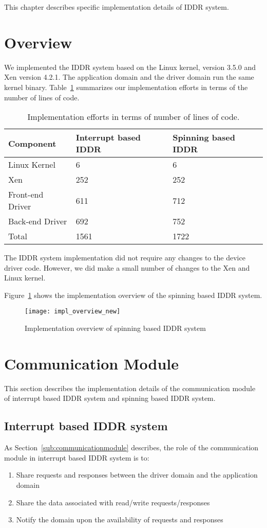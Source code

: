 This chapter describes specific implementation details of IDDR system.

\section{Overview} 
We implemented the IDDR system based on the Linux kernel, version 3.5.0 and
Xen version 4.2.1. The application domain and the driver domain run the same kernel
binary. Table~\ref{tab:base} summarizes our implementation efforts in
terms of the number of lines of code.

\begin{table}
\caption{Implementation efforts in terms of number of lines of code.}
\begin{center}
\begin{tabular}{lll}
  \hline
  \label{tab:base}
  Component & Interrupt based IDDR & Spinning based IDDR \\
  \hline
  Linux Kernel & 6 & 6\\
  Xen & 252 & 252\\
  Front-end Driver & 611 & 712\\
  Back-end Driver & 692 & 752\\
  \hline 
  Total & 1561 & 1722\\
  \hline
\end{tabular}
\end{center}
\end{table}

The IDDR system implementation did not require any changes to the device
driver code. However, we did make a small number of changes to the Xen
and Linux kernel.

Figure~\ref{fig:Implementation overview} shows the implementation overview of 
the spinning based IDDR system.

\begin{figure}[!ht]
\centering
\texttt{[image: impl\_overview\_new]}
\caption{Implementation overview of spinning based IDDR system}
\label{fig:Implementation overview}
\end{figure}

\section{Communication Module}
This section describes the implementation details of the communication
module of interrupt based IDDR system and spinning based IDDR system.

\subsection*{Interrupt based IDDR system}
As Section~\ref{sub:communicationmodule} describes, the role of the communication module in interrupt based IDDR system is to:
\begin{enumerate} 
\item Share requests and responses between the driver domain and the application domain
\item Share the data associated with read/write requests/responses
\item Notify the domain upon the availability of requests and responses 
\end{enumerate}
